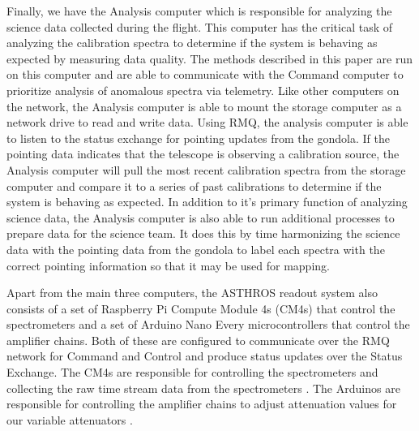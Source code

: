 Finally, we have the Analysis computer which is responsible for analyzing the science data collected during the flight. 
This computer has the critical task of analyzing the calibration spectra to determine if the system is behaving as expected by measuring data quality. 
The methods described in this paper are run on this computer and are able to communicate with the Command computer to prioritize analysis of anomalous spectra via telemetry.
Like other computers on the network, the Analysis computer is able to mount the storage computer as a network drive to read and write data.
Using RMQ, the analysis computer is able to listen to the status exchange for pointing updates from the gondola.
If the pointing data indicates that the telescope is observing a calibration source, the Analysis computer will pull the most recent calibration spectra from the storage computer and compare it to a series of past calibrations to determine if the system is behaving as expected.
In addition to it's primary function of analyzing science data, the Analysis computer is also able to run additional processes to prepare data for the science team. 
It does this by time harmonizing the science data with the pointing data from the gondola to label each spectra with the correct pointing information so that it may be used for mapping. 

Apart from the main three computers, the ASTHROS readout system also consists of a set of Raspberry Pi Compute Module 4s (CM4s) that control the spectrometers and a set of Arduino Nano Every microcontrollers that control the amplifier chains. 
Both of these are configured to communicate over the RMQ network for Command and Control and produce status updates over the Status Exchange. 
The CM4s are responsible for controlling the spectrometers and collecting the raw time stream data from the spectrometers \cite{mohammed2024digital}.
The Arduinos are responsible for controlling the amplifier chains to adjust attenuation values for our variable attenuators \cite{Ricardo}.

